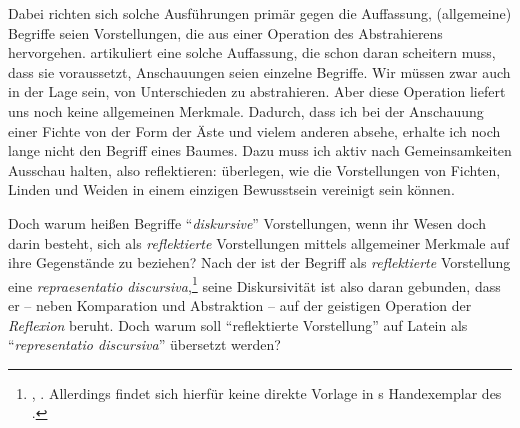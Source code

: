 Dabei richten sich solche Ausführungen primär gegen die Auffassung,
(allgemeine) Begriffe seien  Vorstellungen, die aus einer
Operation des Abstrahierens hervorgehen.
 artikuliert eine solche
Auffassung, die schon daran scheitern muss, dass sie voraussetzt, Anschauungen
seien einzelne Begriffe. Wir müssen zwar auch in der Lage sein, von
Unterschieden zu abstrahieren. Aber diese Operation liefert uns noch keine
allgemeinen Merkmale. Dadurch, dass ich bei der Anschauung einer Fichte von der
Form der Äste und vielem anderen absehe, erhalte ich noch lange nicht den
Begriff eines Baumes. Dazu muss ich aktiv nach Gemeinsamkeiten Ausschau halten,
also reflektieren: überlegen, wie die Vorstellungen von Fichten, Linden und
Weiden in einem einzigen Bewusstsein vereinigt sein können.

Doch warum heißen Begriffe \enquote{\emph{diskursive}} Vorstellungen, wenn ihr
Wesen doch darin besteht, sich als \emph{reflektierte} Vorstellungen mittels
allgemeiner Merkmale auf ihre Gegenstände zu beziehen?
Nach der {\jaeschelogik} ist der Begriff als \emph{reflektierte} Vorstellung
eine \emph{repraesentatio
discursiva},\footnote{\cite[Vgl.][\S~1]{Kant:ImmanuelKantsLogik1977},
\cite[][IX: 91.10]{Kant:GesammelteWerke1900ff.}. Allerdings findet sich hierfür
keine direkte Vorlage in s Handexemplar des
.} seine Diskursivität ist also daran
gebunden, dass er -- neben Komparation und Abstraktion -- auf der geistigen
Operation der \emph{Reflexion} beruht. Doch warum soll \enquote{reflektierte
Vorstellung} auf Latein als \enquote{\emph{representatio discursiva}} übersetzt
werden?

